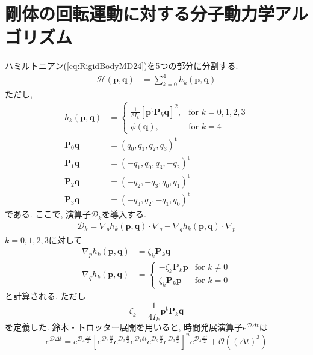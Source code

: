 \section{剛体の回転運動に対する分子動力学アルゴリズム}

ハミルトニアン(\ref{eq:RigidBodyMD24})を5つの部分に分割する. 
\begin{align}
 \mathcal{H}(\bm{p}, \bm{q})
 &=
 \sum_{k=0}^{4} h_{k} (\bm{p}, \bm{q})
\end{align}
ただし, 
\begin{align}
 h_{k} (\bm{p}, \bm{q}) &=
 \begin{cases}
  \frac{1}{8 I_{k}} [\bm{p}^{\mathrm{t}}\bm{P}_{k}\bm{q}]^{2}, &\text{for $k=0,1,2,3$} \\
  \phi(\bm{q}),& \text{for $k=4$}
 \end{cases}
 \\
  \bm{P}_{0} \bm{q}
 &= (q_{0}, q_{1}, q_{2}, q_{3})^{\mathrm{t}}
  \\
 \bm{P}_{1} \bm{q}
 &= (-q_{1}, q_{0}, q_{3}, -q_{2})^{\mathrm{t}}
  \\
 \bm{P}_{2} \bm{q}
 &= (-q_{2}, -q_{3}, q_{0}, q_{1})^{\mathrm{t}}
  \\
 \bm{P}_{3} \bm{q}
 &= (-q_{3}, q_{2}, -q_{1}, q_{0})^{\mathrm{t}}
\end{align}
である. ここで, 演算子$\mathcal{D}_{k}$を導入する. 
\begin{align}
 \mathcal{D}_{k}
 =
 \nabla_{p} h_{k} (\bm{p},\bm{q}) \cdot \nabla_{q}
 -
 \nabla_{q} h_{k} (\bm{p},\bm{q}) \cdot \nabla_{p}
\end{align}
$k=0,1,2,3$に対して
\begin{align}
 \nabla_{p} h_{k} (\bm{p},\bm{q})
 &=
  \zeta_{k} \bm{P}_{k} \bm{q}
 \\
 \nabla_{q} h_{k} (\bm{p},\bm{q})
 &=
 \begin{cases}
  -  \zeta_{k} \bm{P}_{k} \bm{p} &\text{for $k \neq 0$} \\
     \zeta_{k} \bm{P}_{k} \bm{p} &\text{for $k =    0$} 
 \end{cases}
\end{align}
と計算される. ただし
\begin{equation}
 \zeta_{k} = \frac{1}{4I_{k}}
  \bm{p}^{\mathrm{t}} \bm{P}_{k} \bm{q}
\end{equation}
を定義した. 
鈴木・トロッター展開を用いると, 時間発展演算子$e^{\mathcal{D} \Delta t}$は
\begin{equation}
 e^{\mathcal{D} \Delta t}
  =
  e^{\mathcal{D}_{4} \frac{\Delta t}{2}}
  \left[
   e^{\mathcal{D}_{3} \frac{\delta t}{2}}
   e^{\mathcal{D}_{2} \frac{\delta t}{2}}
   e^{\mathcal{D}_{1} \delta t}
   e^{\mathcal{D}_{2} \frac{\delta t}{2}}
   e^{\mathcal{D}_{3} \frac{\delta t}{2}}
  \right]^{n}
  e^{\mathcal{D}_{4} \frac{\Delta t}{2}}
  +
  \mathcal{O}\left( (\Delta t)^{3}\right)
\end{equation}
